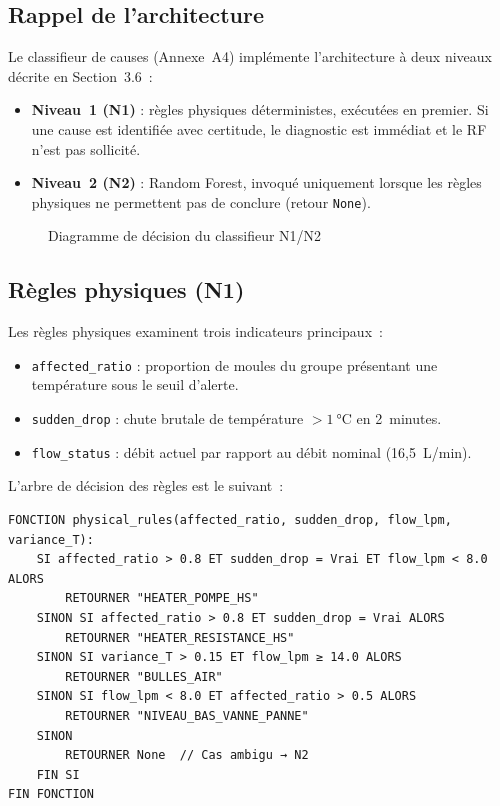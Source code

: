 \subsection{Rappel de l'architecture}

Le classifieur de causes (Annexe~A4) implémente l'architecture à deux niveaux décrite en Section~3.6~:

\begin{itemize}
  \item \textbf{Niveau~1 (N1)} : règles physiques déterministes, exécutées en premier. Si une cause est identifiée avec certitude, le diagnostic est immédiat et le RF n'est pas sollicité.
  \item \textbf{Niveau~2 (N2)} : Random Forest, invoqué uniquement lorsque les règles physiques ne permettent pas de conclure (retour \texttt{None}).
\end{itemize}

\begin{figure}[htbp]
  \centering
  \caption{Diagramme de décision du classifieur N1/N2}
\end{figure}

\subsection{Règles physiques (N1)}

Les règles physiques examinent trois indicateurs principaux~:

\begin{itemize}
  \item \texttt{affected\_ratio} : proportion de moules du groupe présentant une température sous le seuil d'alerte.
  \item \texttt{sudden\_drop} : chute brutale de température \(>1~\si{\celsius}\) en 2~minutes.
  \item \texttt{flow\_status} : débit actuel par rapport au débit nominal (16,5~L/min).
\end{itemize}

L'arbre de décision des règles est le suivant~:

\begin{center}
\begin{minipage}{0.85\textwidth}
\begin{verbatim}
FONCTION physical_rules(affected_ratio, sudden_drop, flow_lpm, variance_T):
    SI affected_ratio > 0.8 ET sudden_drop = Vrai ET flow_lpm < 8.0 ALORS
        RETOURNER "HEATER_POMPE_HS"
    SINON SI affected_ratio > 0.8 ET sudden_drop = Vrai ALORS
        RETOURNER "HEATER_RESISTANCE_HS"
    SINON SI variance_T > 0.15 ET flow_lpm ≥ 14.0 ALORS
        RETOURNER "BULLES_AIR"
    SINON SI flow_lpm < 8.0 ET affected_ratio > 0.5 ALORS
        RETOURNER "NIVEAU_BAS_VANNE_PANNE"
    SINON
        RETOURNER None  // Cas ambigu → N2
    FIN SI
FIN FONCTION
\end{verbatim}
\end{minipage}
\end{center}

